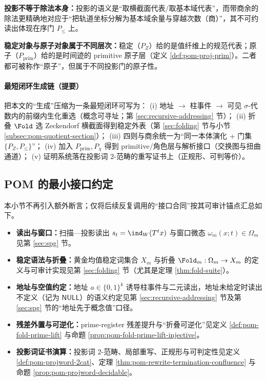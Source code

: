 \begin{remark}[澄清：投影 \texorpdfstring{$\neq$}{!=} 除法；稳定 \texorpdfstring{$\neq$}{!=} 素数]\label{rem:pom-projection-vs-division}
\textbf{投影不等于除法本身：}投影的语义是“取横截面代表/取基本域代表”，而带商余的除法更精确地对应于“把轨道坐标分解为基本域余量与穿越次数（商）”，其不可约读出体现在序门 \(P_{\le}\) 上。
\par
\textbf{稳定对象与原子对象属于不同层次：}稳定（\(P_Z\)）给的是值纤维上的规范代表；原子（\(P_{\mathrm{prim}}\)）给的是时间迹的 primitive 原子层（定义 \ref{def:pom-proj-prim}）。二者都可被称作“原子”，但属于不同投影门的原子性。
\end{remark}

\paragraph{最短闭环生成链（提要）}
把本文的“生成”压缩为一条最短闭环可写为：
(i) 地址 \(\to\) 柱事件 \(\to\) 可见 \(\sigma\)-代数内的前缀内生化重选（概念可寻址；第 \ref{sec:recursive-addressing} 节）；
(ii) 折叠 \(\Fold\) 选 Zeckendorf 横截面得到稳定外表（第 \ref{sec:folding} 节与小节 \ref{subsec:pom-quotient-section}）；
(iii) 四则与商余统一为“同一本体演化 + 门集 \(\{P_Z,P_{\le}\}\)”；
(iv) 加入 \(P_{\mathrm{prim}},P_\chi\) 得到 primitive/角色层与解析接口（交换图与扭曲通道）；
(v) 证明系统落在投影词 \(2\)-范畴的重写证书上（正规形、可判等价）。

\subsection{POM 的最小接口约定}\label{subsec:pom-min}
本小节不再引入额外断言；仅将后续反复调用的“接口合同”按其可审计锚点汇总如下。
\begin{itemize}
  \item \textbf{读出与窗口：}扫描—投影读出 \(s_t=\ind_W(T^t x)\) 与窗口微态 \(\omega_m(x;t)\in\Omega_m\) 见第 \ref{sec:spg} 节。
  \item \textbf{稳定语法与折叠：}黄金均值稳定词集合 \(X_m\) 与折叠 \(\Fold_m:\Omega_m\to X_m\) 的定义与可审计实现见第 \ref{sec:folding} 节（尤其是定理 \ref{thm:fold-suite}）。
  \item \textbf{地址与空值约定：}地址 \(a\in\{0,1\}^k\) 诱导柱事件与二元读出，地址未给定时读出不定义（记为 \(\mathsf{NULL}\)）的语义约定见第 \ref{sec:recursive-addressing} 节及第 \ref{sec:spg} 节的“地址先于概念值”口径。
  \item \textbf{残差外置与可逆化：}prime-register 残差提升与“折叠可逆化”见定义 \ref{def:pom-fold-prime-lift} 与命题 \ref{prop:pom-fold-prime-lift-injective}。
  \item \textbf{投影词证书演算：}投影词 \(2\)-范畴、局部重写、正规形与可判定性见定义 \ref{def:pom-projword-2cat}、定理 \ref{thm:pom-rewrite-termination-confluence} 与命题 \ref{prop:pom-projword-decidable}。
\end{itemize}

